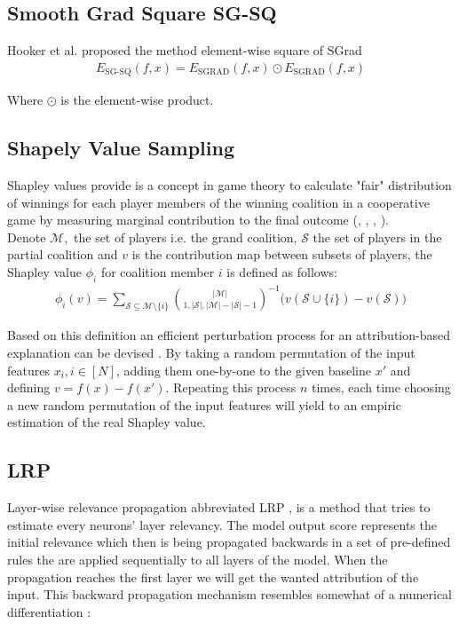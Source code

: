 \documentclass[12pt]{report}
\begin{document}
\subsection{Smooth Grad Square SG-SQ}
Hooker et al. \cite{https://doi.org/10.48550/arxiv.1806.10758} proposed the method element-wise square of SGrad 
\begin{align*}
	E_\text{SG-SQ}(f, x)  = E_\text{SGRAD}(f, x) \odot E_\text{SGRAD}(f, x)
\end{align*}

Where $\odot$ is the element-wise product.


\subsection{Shapely Value Sampling}
Shapley values provide is a concept in game theory to calculate "fair" distribution of winnings for each player members of the winning coalition in a cooperative game by measuring marginal contribution to the final outcome (\cite{CASTRO20091726}, \cite{trumbelj2010AnEE} \cite{Shapley+2016+307+318}, \cite{https://doi.org/10.48550/arxiv.2104.12199}, \cite{https://doi.org/10.48550/arxiv.1903.10464}).\\
		
Denote $\mathcal{M}, $ the set of players i.e. the grand coalition, $\mathcal{S}$ the set of players in the partial coalition and $v$ is the contribution map between subsets of players, the Shapley value $\phi_i$ for coalition member $i$ is defined as follows:
\begin{align*}
	\phi_i(v)=  \sum_{\mathcal{S} \subseteq \mathcal{M} \setminus \{i\}} {|\mathcal{M}| \choose  1, |\mathcal{S}|, |\mathcal{M}| -|\mathcal{S}| -1}^{-1}\Big(v(\mathcal{S}\cup \{i\}) - v(\mathcal{S}) \Big)
\end{align*}
	
Based on this definition an efficient  perturbation process for an attribution-based explanation can be devised \cite{strumbelj2010efficient}. By taking a random permutation of the input features $x_i, i \in [N]$, adding them one-by-one to the given baseline $x'$ and defining $v=f(x)- f(x')$. Repeating this process $n$ times, each time choosing a new random permutation of the input features will yield to an empiric estimation of the real Shapley value.


\subsection{LRP}
Layer-wise relevance propagation abbreviated LRP \cite{LRP} \cite{DBLP:journals/corr/MontavonSM17}, is a method that tries to estimate every neurons' layer relevancy. The model output score represents the initial relevance which then is being propagated backwards in a set of pre-defined rules the are applied sequentially to all layers of the model. When the propagation reaches the first layer we will get the wanted attribution of the input. This backward propagation mechanism resembles somewhat of a numerical differentiation \cite{DBLP:journals/corr/abs-2012-14261}:  
\end{document}
